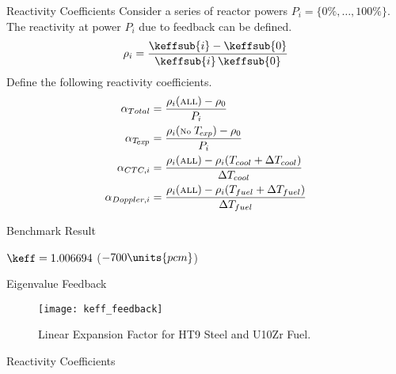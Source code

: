 \begin{frame}{Reactivity Coefficients}
  Consider a series of reactor powers $P_i = \{0\%,\ldots,100\%\}$. The
  reactivity at power $P_i$ due to feedback can be defined.
  \begin{equation}
    \rho_i = \frac{\keffsub{i} - \keffsub{0}}{\keffsub{i} \, \keffsub{0}}
  \end{equation}
  Define the following reactivity coefficients.
  \begin{align}
    \alpha_{Total} &= \frac{\rho_i(\text{\scriptsize ALL})-
      \rho_0}{P_i} \\
    \alpha_{T_{\!\mbox{\scriptsize \em exp}}} &= \frac{\rho_i(\text{\scriptsize 
      No } T_{\!\mbox{\scriptsize \em exp}} )-
      \rho_0}{P_i} \\
    \alpha_{CTC,i} &= \frac{\rho_i(\text{\scriptsize ALL}) - 
      \rho_i(T_{cool}+\Delta T_{cool})}{\Delta T_{cool}} \\
    \alpha_{Doppler,i} &= \frac{\rho_i(\text{\scriptsize ALL}) - 
      \rho_i(T_{fuel}+\Delta T_{fuel})}{\Delta T_{fuel}}
  \end{align}
\end{frame}

\begin{frame}{Benchmark Result}
  \vspace{-0.25in}
  \begin{figure}
    \centering
    \hspace{1in}
  \end{figure}
  \begin{block}{}
    $\keff =  1.006694 $ \qquad (\dif $-700\units{pcm}$)
  \end{block}
\end{frame}

\begin{frame}{Eigenvalue Feedback}
  \begin{figure}
    \centering
    \texttt{[image: keff\_feedback]}
    \caption{Linear Expansion Factor for HT9 Steel and U10Zr Fuel.}
    \label{fig:lef_plot}
  \end{figure}
\end{frame}

\begin{frame}{Reactivity Coefficients}
  \begin{figure}
    \centering
    \hspace*{\fill}
  \end{figure}
\end{frame}
